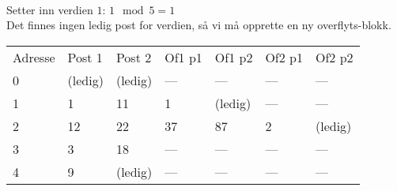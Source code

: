 \documentclass[a4paper, 12pt] {article}
\begin{document}
~\\
Setter inn verdien $1$: $1 \mod 5 = 1$\\
Det finnes ingen ledig post for verdien, så vi må opprette en ny overflyts-blokk.\\
\begin{tabular}{|l|l|l|l|l|l|l|}
    \hline
    Adresse & Post 1 & Post 2 & Of1 p1 & Of1 p2 & Of2 p1 & Of2 p2 \\
    0       & (ledig)& (ledig)& ---   & ---   & ---   & ---   \\
    1       & 1      & 11     & 1      & (ledig)& ---   & ---   \\
    2       & 12     & 22     & 37     & 87     & 2      & (ledig)\\
    3       & 3      & 18     & ---   & ---   & ---   & ---   \\
    4       & 9      & (ledig)& ---   & ---   & ---   & ---   \\ \hline
\end{tabular}
\end{document}
